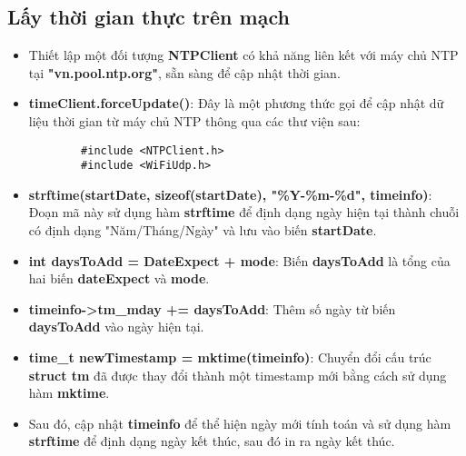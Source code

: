 \documentclass[12pt, a4paper]{article}
\begin{document}
\subsection{Lấy thời gian thực trên mạch}
\begin{itemize}
    \item Thiết lập một đối tượng \textbf{NTPClient} có khả năng liên kết với máy chủ NTP tại \textbf{"vn.pool.ntp.org"}, sẵn sàng để cập nhật thời gian.
    \item \textbf{timeClient.forceUpdate()}: Đây là một phương thức gọi để cập nhật dữ liệu thời gian từ máy chủ NTP thông qua các thư viện sau:
    \begin{lstlisting}
        #include <NTPClient.h>
        #include <WiFiUdp.h>\end{lstlisting}    
    \item \textbf{strftime(startDate, sizeof(startDate), "\%Y-\%m-\%d", timeinfo)}: Đoạn mã này sử dụng hàm \textbf{strftime} để định dạng ngày hiện tại thành chuỗi có định dạng "Năm/Tháng/Ngày" và lưu vào biến \textbf{startDate}.
    \item \textbf{int daysToAdd = DateExpect + mode}: Biến \textbf{daysToAdd} là tổng của hai biến \textbf{dateExpect} và \textbf{mode}.
    \item \textbf{timeinfo->tm\_mday += daysToAdd}: Thêm số ngày từ biến \textbf{daysToAdd} vào ngày hiện tại.
    \item \textbf{time\_t newTimestamp = mktime(timeinfo)}: Chuyển đổi cấu trúc \textbf{struct tm} đã được thay đổi thành một timestamp mới bằng cách sử dụng hàm \textbf{mktime}.
    \item Sau đó, cập nhật \textbf{timeinfo} để thể hiện ngày mới tính toán và sử dụng hàm \textbf{strftime} để định dạng ngày kết thúc, sau đó in ra ngày kết thúc.
\end{itemize}
\end{document}
